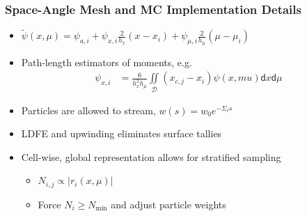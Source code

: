 \documentclass[xcolor=dvipsnames,handout,unknownkeysallowed]{beamer}
\newcommand{\colb}[1]{{\color{blue} #1}}
\newlength{\wideitemsep}
\let\olditem\item
\renewcommand{\item}{\setlength{\itemsep}{\wideitemsep}\olditem}
\renewcommand{\d}{\mathsf{d}}
\begin{document}
\begin{frame}
    \frametitle{Space-Angle Mesh and MC Implementation Details}
    \noindent
    \begin{minipage}[t]{0.36\linewidth}
        \centering
    \end{minipage}%
    \begin{minipage}[t]{0.70\linewidth}
        \vspace{-1.6in}
        \begin{itemize}
            \item {\small $\displaystyle \tilde \psi(x,\mu) = \psi_{a,i} + \psi_{x,i}
                \frac{2}{h_{x}}(x-x_i) + \psi_{\mu,i}
            \frac{2}{h_{\mu}}(\mu-\mu_i)$}
        \item Path-length estimators of moments, e.g.
            {\small
            \begin{align*}
                \psi_{x,i} &= \frac{6}{h_{x}^2h_\mu}
             \iint\limits_\mathcal{D} (x_{c,j}-x_i) \psi(x,mu) \d x \d \mu 
        \end{align*}}    
        \end{itemize}
    \end{minipage}
    \begin{itemize}
        \item Particles are allowed to stream, $w(s)=w_0 e^{-\Sigma_t s}$
        \item LDFE and upwinding \colb{eliminates} surface tallies
    \item Cell-wise, global representation allows for \colb{stratified} sampling
        \begin{itemize}
            \item $N_{i,j} \propto{|r_i(x,\mu)|}$
            \item Force $N_i \geq N_{\min}$ and adjust particle weights
        \end{itemize}

    \end{itemize}

\end{frame}
\end{document}
